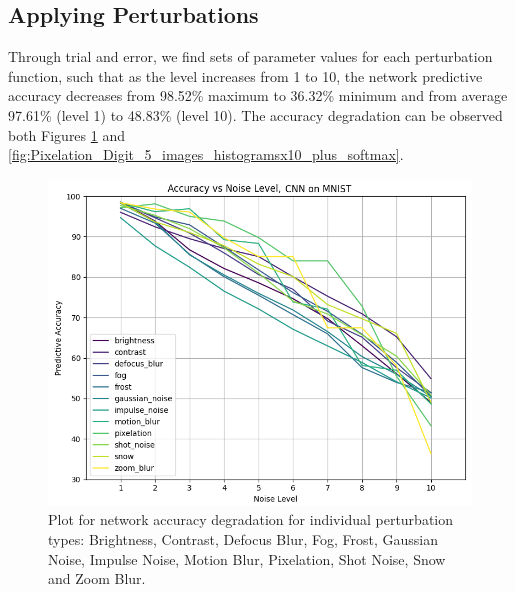 




\subsection{Applying Perturbations}
Through trial and error, we find sets of parameter values
for each perturbation function, such that as the level increases from 1 to
10, the network predictive accuracy decreases from 98.52\%
maximum to 36.32\% minimum and from average 97.61\%
(level 1) to 48.83\% (level 10). The accuracy degradation can be observed both Figures 
\ref{fig:Accuracy_vs_Noise_types} and \ref{fig:Pixelation_Digit_5_images_histogramsx10_plus_softmax}.

\begin{figure}[h] 
\begin{center}
\includegraphics[width=0.99\columnwidth]{Figures/accuracy_vs_noise_types_plot.png}
\end{center}
\caption{Plot for network accuracy degradation for individual perturbation types: Brightness, Contrast, Defocus Blur, Fog, Frost, Gaussian Noise, Impulse Noise, Motion Blur, Pixelation, Shot Noise, Snow and Zoom Blur.}
\label{fig:Accuracy_vs_Noise_types}
\end{figure}

